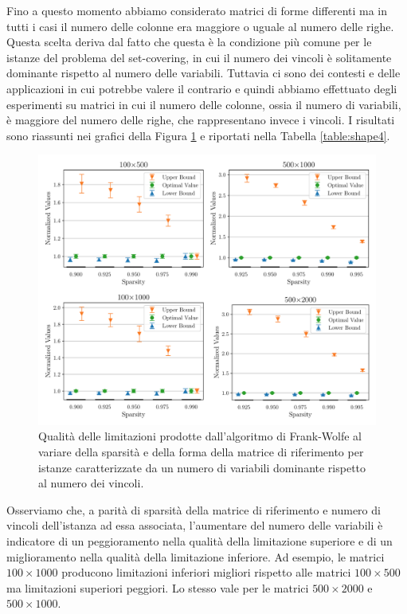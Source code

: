 Fino a questo momento abbiamo considerato matrici di forme differenti ma in tutti i casi il numero delle colonne era
maggiore o uguale al numero delle righe. Questa scelta deriva dal fatto che questa è la condizione più comune per le
istanze del problema del set-covering, in cui il numero dei vincoli è solitamente dominante rispetto al numero delle
variabili. Tuttavia ci sono dei contesti e delle applicazioni in cui potrebbe valere il contrario e quindi abbiamo
effettuato degli esperimenti su matrici in cui il numero delle colonne, ossia il numero di variabili, è maggiore del
numero delle righe, che rappresentano invece i vincoli. I risultati sono riassunti nei grafici della Figura
\ref{fig:shape4} e riportati nella Tabella \ref{table:shape4}.

\begin{figure}[ht]
    \centering
    \includegraphics[width=\textwidth]{assets/figures/reverse.pdf}
    \caption{Qualità delle limitazioni prodotte dall’algoritmo di Frank-Wolfe al variare della sparsità e della forma
    della matrice di riferimento per istanze caratterizzate da un numero di variabili dominante rispetto al numero dei
    vincoli.}
    \label{fig:shape4}
\end{figure}

Osserviamo che, a parità di sparsità della matrice di riferimento e numero di vincoli dell'istanza ad essa associata,
l'aumentare del numero delle variabili è indicatore di un peggioramento nella qualità della limitazione superiore e di
un miglioramento nella qualità della limitazione inferiore. Ad esempio, le matrici \( 100\times 1000 \) producono
limitazioni inferiori migliori rispetto alle matrici \( 100\times 500 \) ma limitazioni superiori peggiori. Lo stesso
vale per le matrici \( 500\times 2000 \) e  \( 500\times 1000 \).


